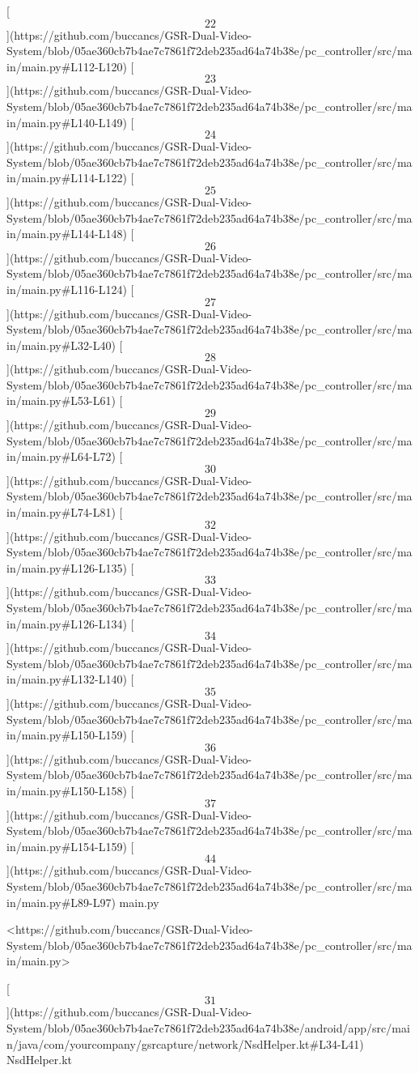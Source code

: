 \documentclass[12pt,a4paper]{article}
\begin{document}
{[\[22\]](https://github.com/buccancs/GSR-Dual-Video-System/blob/05ae360cb7b4ae7c7861f72deb235ad64a74b38e/pc_controller/src/main/main.py#L112-L120)
[\[23\]](https://github.com/buccancs/GSR-Dual-Video-System/blob/05ae360cb7b4ae7c7861f72deb235ad64a74b38e/pc_controller/src/main/main.py#L140-L149)
[\[24\]](https://github.com/buccancs/GSR-Dual-Video-System/blob/05ae360cb7b4ae7c7861f72deb235ad64a74b38e/pc_controller/src/main/main.py#L114-L122)
[\[25\]](https://github.com/buccancs/GSR-Dual-Video-System/blob/05ae360cb7b4ae7c7861f72deb235ad64a74b38e/pc_controller/src/main/main.py#L144-L148)
[\[26\]](https://github.com/buccancs/GSR-Dual-Video-System/blob/05ae360cb7b4ae7c7861f72deb235ad64a74b38e/pc_controller/src/main/main.py#L116-L124)
[\[27\]](https://github.com/buccancs/GSR-Dual-Video-System/blob/05ae360cb7b4ae7c7861f72deb235ad64a74b38e/pc_controller/src/main/main.py#L32-L40)
[\[28\]](https://github.com/buccancs/GSR-Dual-Video-System/blob/05ae360cb7b4ae7c7861f72deb235ad64a74b38e/pc_controller/src/main/main.py#L53-L61)
[\[29\]](https://github.com/buccancs/GSR-Dual-Video-System/blob/05ae360cb7b4ae7c7861f72deb235ad64a74b38e/pc_controller/src/main/main.py#L64-L72)
[\[30\]](https://github.com/buccancs/GSR-Dual-Video-System/blob/05ae360cb7b4ae7c7861f72deb235ad64a74b38e/pc_controller/src/main/main.py#L74-L81)
[\[32\]](https://github.com/buccancs/GSR-Dual-Video-System/blob/05ae360cb7b4ae7c7861f72deb235ad64a74b38e/pc_controller/src/main/main.py#L126-L135)
[\[33\]](https://github.com/buccancs/GSR-Dual-Video-System/blob/05ae360cb7b4ae7c7861f72deb235ad64a74b38e/pc_controller/src/main/main.py#L126-L134)
[\[34\]](https://github.com/buccancs/GSR-Dual-Video-System/blob/05ae360cb7b4ae7c7861f72deb235ad64a74b38e/pc_controller/src/main/main.py#L132-L140)
[\[35\]](https://github.com/buccancs/GSR-Dual-Video-System/blob/05ae360cb7b4ae7c7861f72deb235ad64a74b38e/pc_controller/src/main/main.py#L150-L159)
[\[36\]](https://github.com/buccancs/GSR-Dual-Video-System/blob/05ae360cb7b4ae7c7861f72deb235ad64a74b38e/pc_controller/src/main/main.py#L150-L158)
[\[37\]](https://github.com/buccancs/GSR-Dual-Video-System/blob/05ae360cb7b4ae7c7861f72deb235ad64a74b38e/pc_controller/src/main/main.py#L154-L159)
[\[44\]](https://github.com/buccancs/GSR-Dual-Video-System/blob/05ae360cb7b4ae7c7861f72deb235ad64a74b38e/pc_controller/src/main/main.py#L89-L97)
main.py

<https://github.com/buccancs/GSR-Dual-Video-System/blob/05ae360cb7b4ae7c7861f72deb235ad64a74b38e/pc_controller/src/main/main.py>

[\[31\]](https://github.com/buccancs/GSR-Dual-Video-System/blob/05ae360cb7b4ae7c7861f72deb235ad64a74b38e/android/app/src/main/java/com/yourcompany/gsrcapture/network/NsdHelper.kt#L34-L41)
NsdHelper.kt

}
\end{document}
